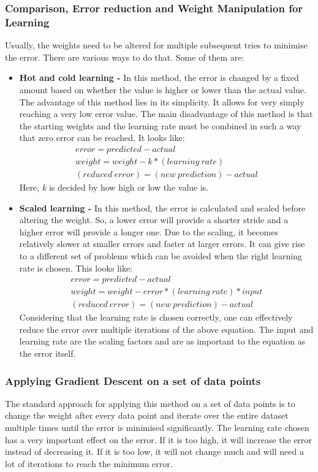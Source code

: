 \documentclass[conference,compsoc]{IEEEtran}
\begin{document}
\subsubsection{Comparison, Error reduction and Weight Manipulation for Learning}
Usually, the weights need to be altered for multiple subsequent tries to minimise the error. There are various ways to do that. Some of them are:
\begin{itemize}
    \item \textbf{Hot and cold learning -} In this method, the error is changed by a fixed amount based on whether the value is higher or lower than the actual value. The advantage of this method lies in its simplicity. It allows for very simply reaching a very low error value. The main disadvantage of this method is that the starting weights and the learning rate must be combined in such a way that zero error can be reached. It looks like:
    \begin{gather*}
    \label{hotncold}
        error = predicted-actual \\
        weight = weight - k*(learning\ rate) \\
        (reduced\ error) = (new\ prediction) - actual
    \end{gather*}
    Here, \emph{k} is decided by how high or low the value is.
    \item \textbf{Scaled learning -} In this method, the error is calculated and scaled before altering the weight. So, a lower error will provide a shorter stride and a higher error will provide a longer one. Due to the scaling, it becomes relatively slower at smaller errors and faster at larger errors. It can give rise to a different set of problems which can be avoided when the right learning rate is chosen. This looks like:
    \begin{gather*}
    \label{scaled}
        error = predicted-actual \\
        weight = weight - error*(learning\ rate)*input \\
        (reduced\ error) = (new\ prediction) - actual
    \end{gather*}
    Considering that the learning rate is chosen correctly, one can effectively reduce the error over multiple iterations of the above equation. The input and learning rate are the scaling factors and are as important to the equation as the error itself.
\end{itemize}

\subsubsection{Applying Gradient Descent on a set of data points}
The standard approach for applying this method on a set of data points is to change the weight after every data point and iterate over the entire dataset multiple times until the error is minimised significantly. The learning rate chosen has a very important effect on the error. If it is too high, it will increase the error instead of decreasing it. If it is too low, it will not change much and will need a lot of iterations to reach the minimum error.\\
\end{document}
